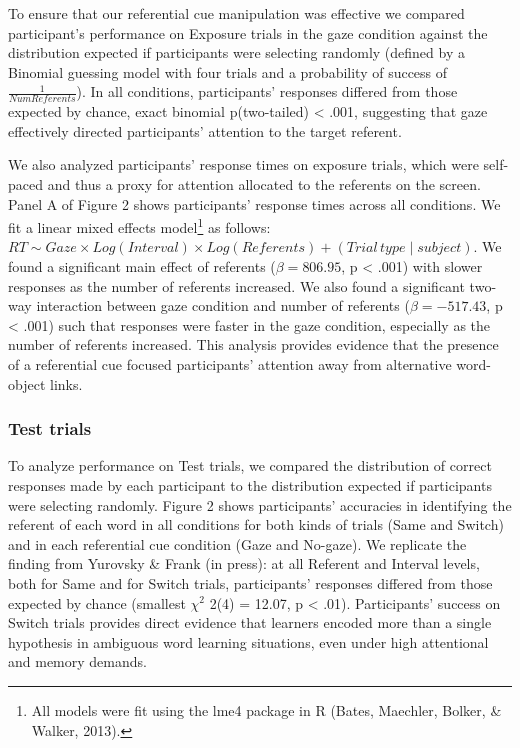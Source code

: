 \documentclass[a4paper,man,natbib]{apa6}
\begin{document}
To ensure that our referential cue manipulation was effective we
compared participant's performance on Exposure trials in the gaze
condition against the distribution expected if participants were
selecting randomly (defined by a Binomial guessing model with four
trials and a probability of success of \(\frac{1}{Num Referents}\)). In
all conditions, participants' responses differed from those expected by
chance, exact binomial p(two-tailed) \textless{} .001, suggesting that
gaze effectively directed participants' attention to the target
referent.

We also analyzed participants' response times on exposure trials, which
were self-paced and thus a proxy for attention allocated to the
referents on the screen. Panel A of Figure 2 shows participants'
response times across all conditions. We fit a linear mixed effects
model\footnote{All models were fit using the lme4 package in R (Bates,
  Maechler, Bolker, \& Walker, 2013).} as follows:
\(RT \sim Gaze \times Log(Interval) \times Log(Referents) + (Trial \, type \mid subject)\).
We found a significant main effect of referents (\(\beta = 806.95\), p
\textless{} .001) with slower responses as the number of referents
increased. We also found a significant two-way interaction between gaze
condition and number of referents (\(\beta = -517.43\), p \textless{}
.001) such that responses were faster in the gaze condition, especially
as the number of referents increased. This analysis provides evidence
that the presence of a referential cue focused participants' attention
away from alternative word-object links.

\subsubsection{Test trials}\label{test-trials}

To analyze performance on Test trials, we compared the distribution of
correct responses made by each participant to the distribution expected
if participants were selecting randomly. Figure 2 shows participants'
accuracies in identifying the referent of each word in all conditions
for both kinds of trials (Same and Switch) and in each referential cue
condition (Gaze and No-gaze). We replicate the finding from Yurovsky \&
Frank (in press): at all Referent and Interval levels, both for Same and
for Switch trials, participants' responses differed from those expected
by chance (smallest \(\chi^2\) 2(4) = 12.07, p \textless{} .01).
Participants' success on Switch trials provides direct evidence that
learners encoded more than a single hypothesis in ambiguous word
learning situations, even under high attentional and memory demands.
\end{document}
